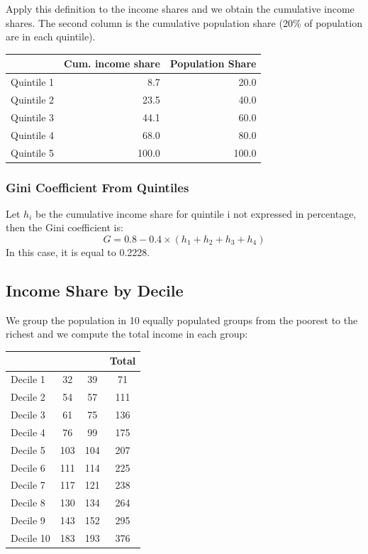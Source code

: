 \documentclass[letterpaper]{article}\usepackage[]{graphicx}\usepackage[]{color}
\numberwithin{exer}{section}
\theoremstyle{nonumberplain}
\begin{document}
Apply this definition to the income shares and we obtain the
cumulative income shares. The second column is the cumulative
population share (20\% of population are in each quintile).
\begin{center}
\begin{tabular}{rrr}
  \hline
 & Cum. income share & Population Share \\ 
  \hline
Quintile 1 & 8.7 & 20.0 \\ 
  Quintile 2 & 23.5 & 40.0 \\ 
  Quintile 3 & 44.1 & 60.0 \\ 
  Quintile 4 & 68.0 & 80.0 \\ 
  Quintile 5 & 100.0 & 100.0 \\ 
   \hline
\end{tabular}

\end{center}

\subsubsection*{Gini Coefficient From Quintiles}

Let $h_i$ be the cumulative income share for quintile i not expressed
in percentage, then the Gini coefficient is:
\[
G = 0.8 - 0.4\times(h_1+h_2+h_3+h_4)
\]
In this case, it is equal to 0.2228.

\subsection*{Income Share by Decile}

We group the population in 10 equally populated groups from the poorest
to the richest and we compute the total income in each group:

\begin{center}
\begin{tabular}{lcc||c}
  \hline
  &&&Total\\ \hline
Decile 1 &  32 &  39 &  71 \\ 
  Decile 2 &  54 &  57 & 111 \\ 
  Decile 3 &  61 &  75 & 136 \\ 
  Decile 4 &  76 &  99 & 175 \\ 
  Decile 5 & 103 & 104 & 207 \\ 
  Decile 6 & 111 & 114 & 225 \\ 
  Decile 7 & 117 & 121 & 238 \\ 
  Decile 8 & 130 & 134 & 264 \\ 
  Decile 9 & 143 & 152 & 295 \\ 
  Decile 10 & 183 & 193 & 376 \\ 
   \hline
\end{tabular}

\end{center}
\end{document}
